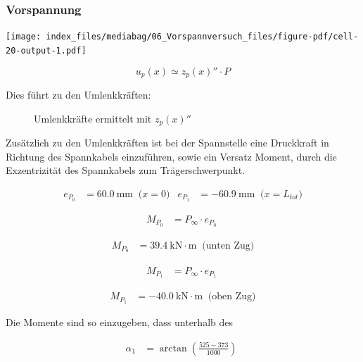 \documentclass[
  11pt,
  letterpaper,
]{scrreprt}
\begin{document}
\subsubsection{Vorspannung}\label{vorspannung-1}

\texttt{[image: index\_files/mediabag/06\_Vorspannversuch\_files/figure-pdf/cell-20-output-1.pdf]}

\[
u_p(x) \simeq z_p(x)'' \cdot P
\]

Dies führt zu den Umlenkkräften:

\begin{figure}[H]


\caption{\label{fig-u_p_von_x}Umlenkkräfte ermittelt mit \(z_p(x)''\)}

\end{figure}%

Zusätzlich zu den Umlenkkräften ist bei der Spannstelle eine Druckkraft
in Richtung des Spannkabels einzuführen, sowie ein Versatz Moment, durch
die Exzentrizität des Spannkabels zum Trägerschwerpunkt.

$$
\begin{aligned}
e_{P_{0}} &= 60.0\ \mathrm{mm} \; \;\textrm{($x=0$)}
 &e_{P_{1}} &= -60.9\ \mathrm{mm} \; \;\textrm{($x=L_{tot}$)}
\end{aligned}
$$

$$
\begin{aligned}
M_{P_{0}} &= P_{\infty} \cdot e_{P_{0}} \; 
\end{aligned}
$$

$$
\begin{aligned}
M_{P_{0}} &= 39.4\ \mathrm{kN} \cdot \mathrm{m} \; \;\textrm{(unten Zug)}
\end{aligned}
$$

$$
\begin{aligned}
M_{P_{1}} &= P_{\infty} \cdot e_{P_{1}} \; 
\end{aligned}
$$

$$
\begin{aligned}
M_{P_{1}} &= -40.0\ \mathrm{kN} \cdot \mathrm{m} \; \;\textrm{(oben Zug)}
\end{aligned}
$$

Die Momente sind so einzugeben, dass unterhalb des

$$
\begin{aligned}
\alpha_{1} &= \operatorname{arctan} { \left( \frac{ 525 - 373 }{ 1000 } \right) } \; 
\end{aligned}
$$
\end{document}
